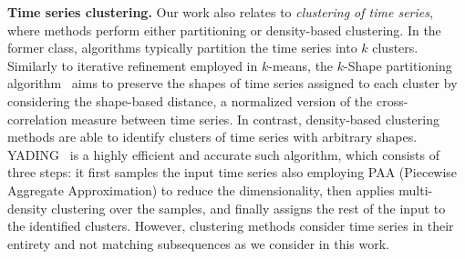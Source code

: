 \begin{comment}
\checknote{Co-evolving time series.}
There are some works in the literature that focus on co-evolving time series, but from a different perspective. In \cite{yongjie2015fast}, the authors deal with the problem of detecting and correcting missing values on networks of co-evolving time series data. To achieve this, they reduce the problem to a \textit{collaborative filtering} one, and solve it via \textit{matrix factorization}. Finally, in \cite{matsubara2014autoplait}, the authors present \textit{AutoPlait}, a scalable, automatic mining algorithm for co-evolving time series that operates on large datasets and finds similar segment groups that agree with human intuition. Given a large collection of co-evolving time series, they find the typical patterns and the points of variation, so as to statistically summarize all sequences and achieve a meaningful segmentation.
\end{comment}

\textbf{Time series clustering.}
Our work also relates to {\em clustering of time series}, where methods perform either partitioning or density-based clustering. In the former class, algorithms typically partition the time series into $k$ clusters. Similarly to iterative refinement employed in $k$-means, the $k$-Shape partitioning algorithm~\cite{Paparrizos:2015:KEA:2723372.2737793,Paparrizos:2017:FAT:3086510.3044711} aims to preserve the shapes of time series assigned to each cluster by considering the shape-based distance, a normalized version of the cross-correlation measure between time series. In contrast, density-based clustering methods are able to identify clusters of time series with arbitrary shapes. YADING~\cite{Ding:2015:YFC:2735479.2735481} is a highly efficient and accurate such algorithm, which consists of three steps: it first samples the input time series also employing PAA (Piecewise Aggregate Approximation) to reduce the dimensionality, then applies multi-density clustering over the samples, and finally assigns the rest of the input to the identified clusters. However, clustering methods consider time series in their entirety and not matching subsequences as we consider in this work.

